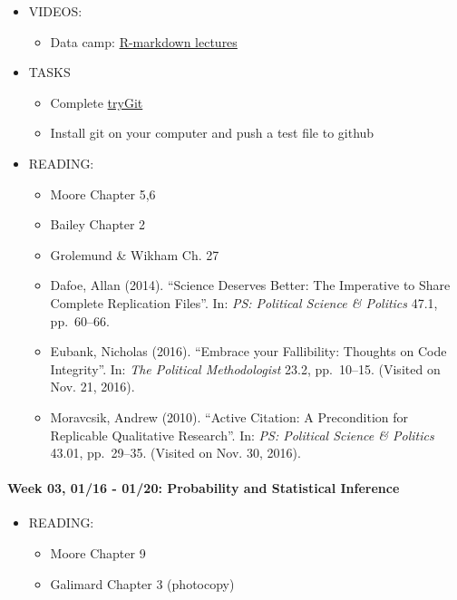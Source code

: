 \documentclass[11pt,]{article}
\providecommand{\tightlist}{%
  \setlength{\itemsep}{0pt}\setlength{\parskip}{0pt}}
\begin{document}
\begin{itemize}
\tightlist
\item
  VIDEOS:

  \begin{itemize}
  \tightlist
  \item
    Data camp:
    \href{https://www.datacamp.com/courses/dplyr-data-manipulation-r-tutorial}{R-markdown
    lectures}
  \end{itemize}
\item
  TASKS

  \begin{itemize}
  \tightlist
  \item
    Complete \href{https://try.github.io/levels/1/challenges/1}{tryGit}
  \item
    Install git on your computer and push a test file to github
  \end{itemize}
\item
  READING:

  \begin{itemize}
  \item
    Moore Chapter 5,6
  \item
    Bailey Chapter 2
  \item
    Grolemund \& Wikham Ch. 27
  \item
     Dafoe, Allan (2014). ``Science Deserves Better:
    The Imperative to Share Complete Replication Files''. In:
    \emph{PS: Political Science \& Politics} 47.1, pp.~60--66.
  \item
     Eubank, Nicholas (2016). ``Embrace your
    Fallibility: Thoughts on Code Integrity''. In:
    \emph{The Political Methodologist} 23.2, pp.~10--15. (Visited on
    Nov. 21, 2016).
  \item
     Moravcsik, Andrew (2010). ``Active Citation: A
    Precondition for Replicable Qualitative Research''. In:
    \emph{PS: Political Science \& Politics} 43.01, pp.~29--35. (Visited
    on Nov. 30, 2016).
  \end{itemize}
\end{itemize}

\paragraph{Week 03, 01/16 - 01/20: Probability and Statistical
Inference}\label{week-03-0116---0120-probability-and-statistical-inference}

\begin{itemize}
\tightlist
\item
  READING:

  \begin{itemize}
  \tightlist
  \item
    Moore Chapter 9
  \item
    Galimard Chapter 3 (photocopy)
  \end{itemize}
\end{itemize}
\end{document}
